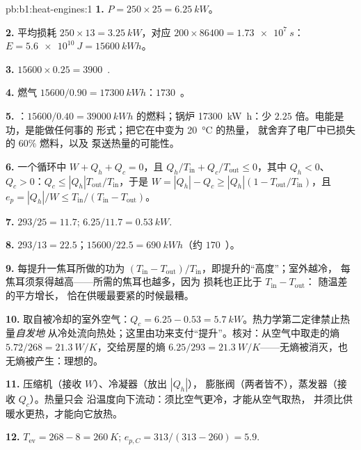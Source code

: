 \begin{solution}{pb:b1:heat-engines:1}
\textbf{1.} $P = 250 \times 25 = \qty{6.25}{kW}$。

\textbf{2.} 平均损耗 $250 \times 13 = \qty{3.25}{kW}$，对应 $200 \times 86400 =
\qty{1.73e7}{s}$：$E = \qty{5.6e10}{J} = \qty{15600}{kW h}$。

\textbf{3.} $15600 \times 0.25 = 3900$~\texteuro.

\textbf{4.} 燃气 $15600/0.90 = \qty{17300}{kW h}$：$1730$~\texteuro。

\textbf{5.} ：$15600/0.40 = \qty{39000}{kW h}$ 的燃料；锅炉
\qty{17300}{kW h}：少 $2.25$ 倍。电能是功，是能做任何事的
形式；把它在中变为 \qty{20}{\degreeCelsius} 的热量，
就舍弃了电厂中已损失的 $60\%$ 燃料，以及
泵送热量的可能性。

\textbf{6.} 一个循环中 $W + Q_h + Q_c = 0$，且 $Q_h/T_{\mathrm{in}} +
Q_c/T_{\mathrm{out}} \leq 0$，其中 $Q_h < 0$、$Q_c > 0$：$Q_c \leq
|Q_h|T_{\mathrm{out}}/T_{\mathrm{in}}$，于是 $W = |Q_h| - Q_c \geq |Q_h|(1 -
T_{\mathrm{out}}/T_{\mathrm{in}})$，且 $e_p = |Q_h|/W \leq T_{\mathrm{in}}/(T_{\mathrm{in}} -
T_{\mathrm{out}})$。

\textbf{7.} $293/25 = 11.7$; $6.25/11.7 = \qty{0.53}{kW}$.

\textbf{8.} $293/13 = 22.5$；$15600/22.5 = \qty{690}{kW h}$（约
$170$~\texteuro）。

\textbf{9.} 每提升一焦耳所做的功为 $(T_{\mathrm{in}} - T_{\mathrm{out}})/
T_{\mathrm{in}}$，即提升的“高度”；室外越冷，
每焦耳须泵得越高——所需的焦耳也越多，因为
损耗也正比于 $T_{\mathrm{in}} - T_{\mathrm{out}}$：
随温差的平方增长，
恰在供暖最要紧的时候最糟。

\textbf{10.} 取自被冷却的室外空气：$Q_c = 6.25 - 0.53 =
\qty{5.7}{kW}$。热力学第二定律禁止热量\emph{自发地}
从冷处流向热处；这里由功来支付“提升”。核对：从空气中取走的熵
$5.72/268 = \qty{21.3}{W/K}$，交给房屋的熵 $6.25/293 =
\qty{21.3}{W/K}$——无熵被消灭，也无熵被产生：理想的。

\textbf{11.} 压缩机（接收 $W$）、冷凝器（放出 $|Q_h|$），
膨胀阀（两者皆不），蒸发器（接收 $Q_c$）。热量只会
沿温度向下流动：须比空气更冷，才能从空气取热，
并须比供暖水更热，才能向它放热。

\textbf{12.} $T_{\mathrm{ev}} = 268 - 8 = \qty{260}{K}$; $e_{p,C} = 313/(313 - 260)
= 5.9$.


\end{solution}
